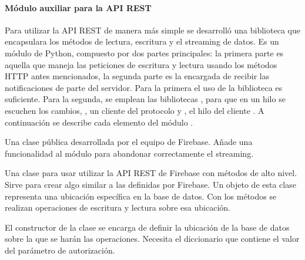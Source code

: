 \paragraph{Módulo auxiliar para la API REST}
\label{\detokenize{nao_firebase:modulo-auxiliar-para-la-api-rest}}
Para utilizar la API REST de manera más simple se desarrolló una biblioteca
que encapsulara los métodos de lectura, escritura y el streaming de datos.
Es un módulo de Python, compuesto por dos partes principales: la primera parte
es aquella que maneja las peticiones de escritura y lectura usando los métodos
HTTP antes mencionados, la segunda parte es la encargada de recibir las
notificaciones de parte del servidor. Para la primera el uso de la biblioteca
 es suficiente. Para la segunda, se emplean las bibliotecas
, para que en un hilo se escuchen los cambios, ,
un cliente del protocolo  y , el hilo del cliente .
A continuación se describe cada elemento del módulo .
\newline

Una clase pública desarrollada por el equipo de Firebase.
Añade una funcionalidad al módulo  para
abandonar correctamente el streaming.
\newline

Una clase para usar utilizar la API REST de Firebase con métodos de alto nivel.
Sirve para crear algo similar a las  definidas por Firebase.
Un objeto de esta clase representa una ubicación específica en la base de datos.
Con los métodos se realizan operaciones de escritura y lectura sobre esa ubicación.

El constructor de la clase se encarga de definir la ubicación de la base de datos
sobre la que se harán las operaciones.
Necesita el diccionario  que contiene el valor del parámetro de autorización.

